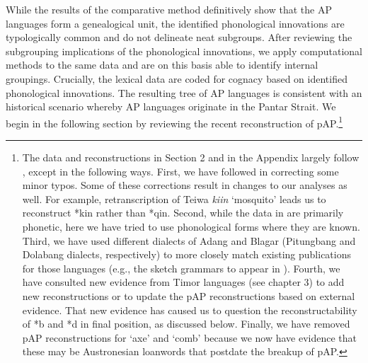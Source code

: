 While the results of the comparative method definitively show that the AP languages form a genealogical unit, the identified phonological innovations are typologically common and do not delineate neat subgroups. After reviewing the subgrouping implications of the phonological innovations, we apply computational methods to the same data and are on this basis able to identify internal groupings. Crucially, the lexical data are coded for cognacy based on identified phonological innovations. The resulting tree of AP languages is consistent with an historical scenario whereby AP languages originate in the Pantar Strait. We begin in the following section by reviewing the recent reconstruction of pAP.\footnote{ The data and reconstructions in Section 2 and in the Appendix largely follow \citep{HoltonEtAl2012}, except in the following ways. First, we have followed \citet{RobinsonEtAl2012internal} in correcting some minor typos. Some of these corrections result in changes to our analyses as 
well. For example, retranscription of Teiwa \textit{ki{\textglotstop}in }`mosquito' leads us to reconstruct *kin rather than *qin. Second, while the data in \citep{HoltonEtAl2012} are primarily phonetic, here we have tried to use phonological forms where they are known. Third, we have used different dialects of Adang and Blagar (Pitungbang and Dolabang dialects, respectively) to more closely match existing publications for those languages (e.g., the sketch grammars to appear in \citealt{Schapper-grammars}). Fourth, we have consulted new evidence from Timor languages (see chapter 3) to add new reconstructions or to update the pAP reconstructions based on external evidence. That new evidence has caused us to question the reconstructability of *b and *d in final position, as discussed below. Finally, we have removed pAP reconstructions for `axe' and `comb' because we now have evidence that these may be Austronesian loanwords that postdate the breakup of pAP.} 

